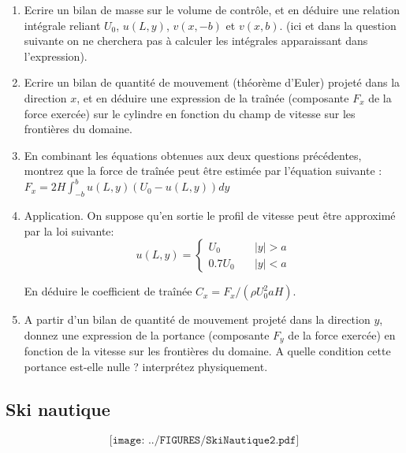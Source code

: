 \begin{enumerate}

\item Ecrire un bilan de masse sur le volume de contrôle, et en déduire une relation intégrale reliant $U_0$, $u(L,y)$, $v(x,-b)$ et $v(x,b)$.
(ici et dans la question suivante on ne cherchera pas à calculer les intégrales apparaissant dans l'expression).


\item Ecrire un bilan de quantité de mouvement (théorème d'Euler) projeté dans la direction $x$, et en déduire une expression de la traînée (composante $F_x$ de la force exercée) sur le cylindre en fonction du champ de vitesse sur les frontières du domaine.



\item En combinant les équations obtenues aux deux questions précédentes, montrez que la force de traînée peut être estimée par l'équation suivante :
$
F_x = 2 H \int_{-b}^{b} u(L,y) \left( U_0 - u(L,y) \right) dy 
$


\item
Application. On suppose qu'en sortie le profil de vitesse peut être approximé par la loi suivante: 
$$
u(L,y) = \left\{ \begin{array}{ll} U_0 \quad & |y|> a \\ 0.7 U_0 \quad & |y|< a \end{array}
\right.
$$

En déduire le coefficient de traînée $C_x = F_x / (\rho U_0^2 a H)$.


\item A partir d'un bilan de quantité de mouvement projeté dans la direction $y$, donnez une expression de la portance (composante $F_y$ de la force exercée) en fonction de la vitesse sur les frontières du domaine. A quelle condition cette portance est-elle nulle ? interprétez physiquement.


\end{enumerate}



\subsection{Ski nautique} 

$$
\texttt{[image: ../FIGURES/SkiNautique2.pdf]}
$$
\vspace{-5cm}

